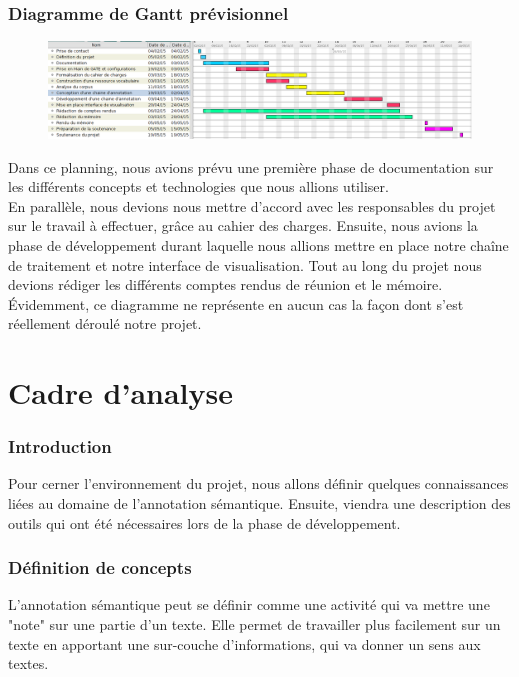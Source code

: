 \documentclass[a4paper, 11pt]{report}
\begin{document}
    \section{Diagramme de Gantt prévisionnel}
    \begin{figure}[H]
    \includegraphics[scale=.3]{img/ganttPrev.png}
    \end{figure}
    Dans ce planning, nous avions prévu une première phase de documentation sur les différents concepts et technologies que nous allions utiliser. \\
En parallèle, nous devions nous mettre d’accord avec les responsables du projet sur le travail à effectuer, grâce au cahier des charges.
Ensuite, nous avions la phase de développement durant laquelle nous allions mettre en place notre chaîne de traitement et notre interface de visualisation. Tout au long du projet nous devions rédiger les différents comptes rendus de réunion et le mémoire.\\
Évidemment, ce diagramme ne représente en aucun cas la façon dont s’est réellement déroulé notre projet.
\part{Cadre d'analyse}
\section*{Introduction}
Pour cerner l'environnement du projet, nous allons définir quelques connaissances liées au domaine de l'annotation sémantique. Ensuite, viendra une description des outils qui ont été nécessaires lors de la phase de développement.\\

\section{Définition de concepts}
L'annotation sémantique peut se définir comme une activité qui va mettre une "note" sur une partie d'un texte. Elle permet de travailler plus facilement sur un texte en apportant une sur-couche d'informations, qui va donner un sens aux textes.\cite{GLNS09}
\end{document}
